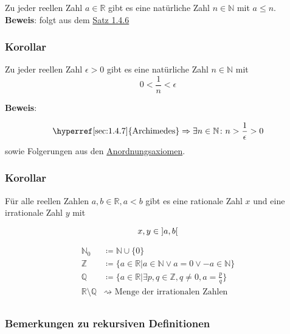 \documentclass{article}
\begin{document}
Zu jeder reellen Zahl $a \in \mathbb{R}$ gibt es eine natürliche Zahl $n \in \mathbb{N}$ mit $a \leq n$. \\

\textbf{Beweis}: folgt aus dem \hyperref[sec:1.4.6]{Satz 1.4.6}

\subsubsection{Korollar}

Zu jeder reellen Zahl $\epsilon > 0$ gibt es eine natürliche Zahl $n \in \mathbb{N}$ mit
\[
  0 < \frac{1}{n} < \epsilon 
\]

\textbf{Beweis}:

\[
  \text{\hyperref[sec:1.4.7]{Archimedes}} \Rightarrow \exists n \in \mathbb{N} \colon n > \frac{1}{\epsilon} > 0
\]
sowie Folgerungen aus den \hyperref[sec:1.2.3]{Anordnungsaxiomen}.

\subsubsection{Korollar}

Für alle reellen Zahlen $a, b \in \mathbb{R}, a < b$ gibt es eine rationale Zahl $x$
und eine irrationale Zahl $y$ mit

\[
  x, y \in \interval[open]{a}{b}
\]

\begin{align*}
  \mathbb{N}_0                    &\coloneqq \mathbb{N} \cup \{ 0 \} \\
  \mathbb{Z}                      &\coloneqq \{ a \in \mathbb{R} | a \in \mathbb{N} \lor a = 0 \lor -a \in \mathbb{N} \} \\
  \mathbb{Q}                      &\coloneqq \{ a \in \mathbb{R} | \exists p, q \in \mathbb{Z}, q \ne 0, a = \frac{p}{q} \} \\
  \mathbb{R} \setminus \mathbb{Q} &\rightsquigarrow \text{ Menge der irrationalen Zahlen} \\
\end{align*}

\setcounter{subsubsection}{12}
\subsubsection{Bemerkungen zu rekursiven Definitionen}

 \\
\end{document}
